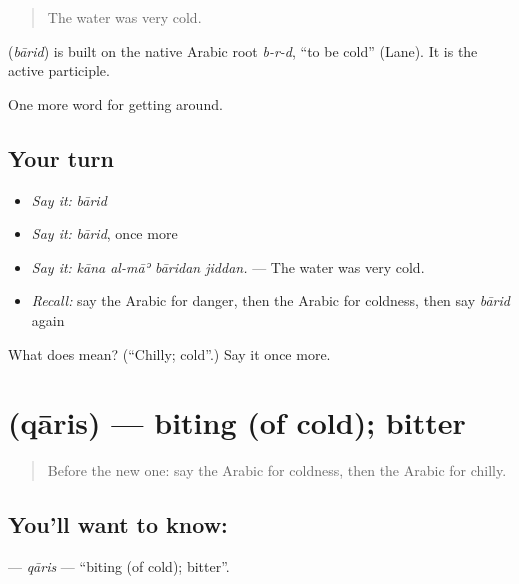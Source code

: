 \begin{quote}
The water was very cold.
\end{quote}

\begin{cousinweb}
\textbf{} (\emph{bārid}) is built on the native Arabic root \emph{b-r-d}, \textquotedblleft{}to be cold\textquotedblright{} (Lane). It is the active participle.
\end{cousinweb}

\begin{grammarlens}[title={What you've built}]
One more word for getting around.
\end{grammarlens}

\subsection*{Your turn}
\begin{itemize}
\raggedright
  \item \emph{Say it:} \emph{bārid}
  \item \emph{Say it:} \emph{bārid}, once more
  \item \emph{Say it:} \emph{kāna al-māʾ bāridan jiddan.} — The water was very cold.
  \item \emph{Recall:} say the Arabic for danger, then the Arabic for coldness, then say \emph{bārid} again
\end{itemize}

\begin{tcolorbox}[breakable,colback=teal!4,colframe=teal!35!black,title={Before you move on}]
What does  mean? (\textquotedblleft{}Chilly; cold\textquotedblright{}.) Say it once more.
\end{tcolorbox}
\section[\texorpdfstring{\ar{قارس} (qāris)}{قارس (qāris)}]{ (qāris) — biting (of cold); bitter}

\label{lesson:AR-C483-qaris}



\begin{quote}
Before the new one: say the Arabic for coldness, then the Arabic for chilly.
\end{quote}

\subsection*{You'll want to know: }
\textbf{} — \emph{qāris} — \textquotedblleft{}biting (of cold); bitter\textquotedblright{}.

